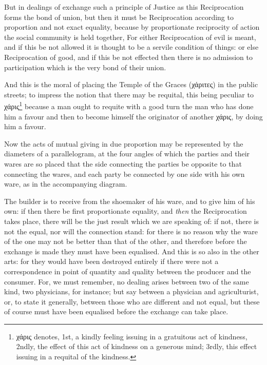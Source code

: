 But in dealings of exchange such a principle of Justice as this Reciprocation
forms the bond of union, but then it must be Reciprocation according to
proportion and not exact equality, because by proportionate reciprocity of
action the social community is held together, For either Reciprocation of evil
is meant, and if this be not allowed it is thought to be a servile condition of
things: or else Reciprocation of good, and if this be not effected then there
is no admission to participation which is the very bond of their union.

And this is the moral of placing the Temple of the Graces
(χάριτες) in the public streets; to impress
the notion that there may be requital, this being peculiar to
χάρις\footnote{χάρις denotes, 1st, a kindly feeling issuing in a
gratuitous act of kindness, 2ndly, the effect of this act of kindness on a
generous mind; 3rdly, this effect issuing in a requital of the kindness.}
because a man ought to requite with a good turn the man who has done him a
favour and then to become himself the originator of another
χάρις, by doing him a favour.

Now the acts of mutual giving in due proportion may be represented by the
diameters of a parallelogram, at the four angles of which the parties and their
wares are so placed that the side connecting the parties be opposite to that
connecting the wares, and each party be connected by one side with his own
ware, as in the accompanying diagram.

The builder is to receive from the shoemaker of his ware, and to give him of
his own: if then there be first proportionate equality, and \emph{then} the
Reciprocation takes place, there will be the just result which we are speaking
of: if not, there is not the equal, nor will the connection stand: for there is
no reason why the ware of the one may not be better than that of the other, and
therefore before the exchange is made they must have been equalised. And this
is so also in the other arts: for they would have been destroyed entirely if
there were not a correspondence in point of quantity and quality between the
producer and the consumer. For, we must remember, no dealing arises between two
of the same kind, two physicians, for instance; but say between a physician and
agriculturist, or, to state it generally, between those who are different and
not equal, but these of course must have been equalised before the exchange can
take place.

